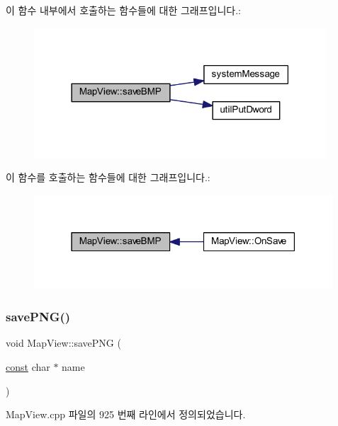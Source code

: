 이 함수 내부에서 호출하는 함수들에 대한 그래프입니다.\+:
\nopagebreak
\begin{figure}[H]
\begin{center}
\leavevmode
\includegraphics[width=309pt]{class_map_view_a792d85841dc88e63ab7f31ed6de066d7_cgraph}
\end{center}
\end{figure}
이 함수를 호출하는 함수들에 대한 그래프입니다.\+:
\nopagebreak
\begin{figure}[H]
\begin{center}
\leavevmode
\includegraphics[width=316pt]{class_map_view_a792d85841dc88e63ab7f31ed6de066d7_icgraph}
\end{center}
\end{figure}
\mbox{\label{class_map_view_afadc38148227210fd5d8e12c50e7f22d}} 
\subsubsection{\texorpdfstring{save\+P\+N\+G()}{savePNG()}}
{\footnotesize\ttfamily void Map\+View\+::save\+P\+NG (\begin{DoxyParamCaption}\item[{\mbox{\hyperlink{getopt1_8c_a2c212835823e3c54a8ab6d95c652660e}{const}} char $\ast$}]{name }\end{DoxyParamCaption})}



Map\+View.\+cpp 파일의 925 번째 라인에서 정의되었습니다.


